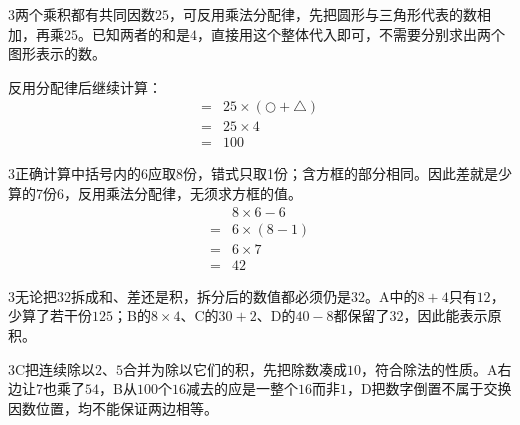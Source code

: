 \documentclass[multi=snippet,border={5bp 20bp 5bp 5bp}]{standalone}
\newenvironment{snippet}[3]{\begin{minipage}{#1bp}\color{answerred}\fontsize{#2}{#3}\selectfont\raggedright}{\end{minipage}}
\begin{document}
\begin{snippet}{505}{11.5}{14}\begin{multicols}{3}\raggedcolumns 两个乘积都有共同因数\(25\)\allowbreak ，可反用乘法分配律，先把圆形与三角形代表的数相加，再乘\(25\)\allowbreak 。已知两者的和是\(4\)\allowbreak ，直接用这个整体代入即可，不需要分别求出两个图形表示的数。\par 反用分配律后继续计算：\[\begin{aligned}={}&25\times(\bigcirc+\triangle)\\={}&25\times4\\={}&100\end{aligned}\]\end{multicols}\end{snippet}
\begin{snippet}{505}{11.5}{14}\begin{multicols}{3}\raggedcolumns 正确计算中括号内的6应取8份，错式只取1份；含方框的部分相同。因此差就是少算的7份6，反用乘法分配律，无须求方框的值。\[\begin{aligned}&8\times6-6\\={}&6\times(8-1)\\={}&6\times7\\={}&42\end{aligned}\]\end{multicols}\end{snippet}
\begin{snippet}{505}{11.5}{14}\begin{multicols}{3}\raggedcolumns 无论把\(32\)\allowbreak 拆成和、差还是积，拆分后的数值都必须仍是\(32\)\allowbreak 。A中的\(8+4\)\allowbreak 只有\(12\)\allowbreak ，少算了若干份\(125\)\allowbreak ；B的\(8\times4\)\allowbreak 、C的\(30+2\)\allowbreak 、D的\(40-8\)\allowbreak 都保留了\(32\)\allowbreak ，因此能表示原积。\end{multicols}\end{snippet}
\begin{snippet}{505}{11.5}{14}\begin{multicols}{3}\raggedcolumns C把连续除以\(2\)\allowbreak 、\(5\)\allowbreak 合并为除以它们的积，先把除数凑成\(10\)\allowbreak ，符合除法的性质。A右边让\(7\)\allowbreak 也乘了\(54\)\allowbreak ，B从\(100\)\allowbreak 个\(16\)\allowbreak 减去的应是一整个\(16\)\allowbreak 而非\(1\)\allowbreak ，D把数字倒置不属于交换因数位置，均不能保证两边相等。\end{multicols}\end{snippet}
\end{document}
